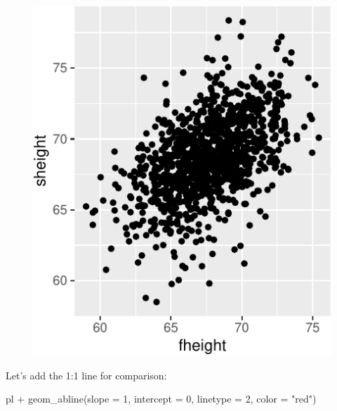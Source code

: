 \documentclass[
  letterpaper,
  DIV=11,
  numbers=noendperiod]{scrreprt}
\newenvironment{Shaded}{\begin{snugshade}}{\end{snugshade}}
\newcommand{\AttributeTok}[1]{\textcolor[rgb]{0.40,0.45,0.13}{#1}}
\newcommand{\DecValTok}[1]{\textcolor[rgb]{0.68,0.00,0.00}{#1}}
\newcommand{\FunctionTok}[1]{\textcolor[rgb]{0.28,0.35,0.67}{#1}}
\newcommand{\NormalTok}[1]{\textcolor[rgb]{0.00,0.23,0.31}{#1}}
\newcommand{\SpecialCharTok}[1]{\textcolor[rgb]{0.37,0.37,0.37}{#1}}
\newcommand{\StringTok}[1]{\textcolor[rgb]{0.13,0.47,0.30}{#1}}
\begin{document}
\begin{figure}[H]

{\centering \includegraphics{./08-linearreg_files/figure-pdf/unnamed-chunk-2-1.pdf}

}

\end{figure}

Let's add the 1:1 line for comparison:

\begin{Shaded}
\begin{Highlighting}[]
\NormalTok{pl }\SpecialCharTok{+} \FunctionTok{geom\_abline}\NormalTok{(}\AttributeTok{slope =} \DecValTok{1}\NormalTok{, }\AttributeTok{intercept =} \DecValTok{0}\NormalTok{, }\AttributeTok{linetype =} \DecValTok{2}\NormalTok{, }\AttributeTok{color =} \StringTok{"red"}\NormalTok{)}
\end{Highlighting}
\end{Shaded}
\end{document}
